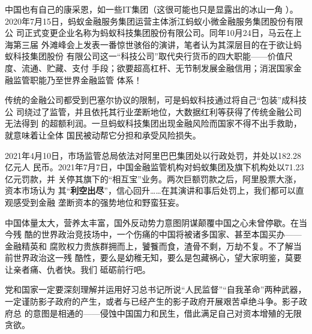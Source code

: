 中国也有自己的康采恩，如一些IT集团（这很可能也只是显露出的冰山一角
）。2020年7月15日，蚂蚁金融服务集团运营主体浙江蚂蚁小微金融服务集团股份有限公
司正式变更企业名称为蚂蚁科技集团股份有限公司。同年10月24日，马云在上海第三届
外滩峰会上发表一番惊世骇俗的演讲，笔者认为其深层目的在于欲让蚂蚁科技集团股份
有限公司这一“科技公司”取代央行货币的四大职能——价值尺度、流通、贮藏、支付
手段；欲要超高杠杆、无节制发展金融信用；消泯国家金融监管职能乃至世界金融监管
体系！

传统的金融公司都受到巴塞尔协议的限制，可是蚂蚁科技通过将自己“包装”成科技公
司绕过了监管，并且依托其行业垄断地位，大数据红利等获得了传统金融公司无法得到
的超额利润。一旦蚂蚁科技集团出现金融风险而国家不得不出手救助，就意味着让全体
国民被动帮它分担和承受风险损失。


2021年4月10日，市场监管总局依法对阿里巴巴集团处以行政处罚，并处以182.28亿元人
民币。2021年7月7日，中国金融监管机构对蚂蚁集团及旗下机构处以71.23亿元罚款，并
关停其旗下的“相互宝”业务。两次巨额罚款之后，阿里股票大涨，资本市场认为
其“\textbf{利空出尽}”，信心回升……在其演讲和事后处罚上，我们都可以直观感受到金融
垄断资本的强势地位和野蛮狂妄。


中国体量太大，营养太丰富，国外反动势力意图阴谋颠覆中国之心未曾停歇。在当今残
酷的世界政治竞技场中，一个伤痛的中国将被诸多国家、甚至本国买办——金融精英和
腐败权力贵族群拥而上，饕餮而食，渣骨不剩，万劫不复。不了解当前世界政治这一残
酷性，要么是幼稚无知，要么是包藏祸心，望大家明鉴，莫要让亲者痛、仇者快。我们
砥砺前行吧。

党和国家一定要深刻理解并运用好习总书记所说“人民监督”“自我革命”两种武器，
一定谨防影子政府的产生，或者与已经产生的影子政府开展艰苦卓绝斗争。影子政府总
的意图是相通的——侵蚀中国国力和民生，借此满足自己对资本增殖的无限贪欲。











